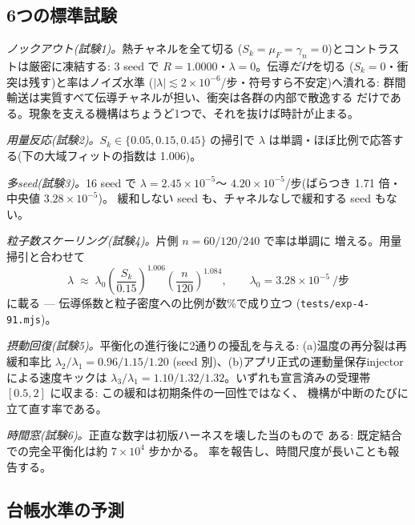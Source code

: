 \documentclass[a4paper,10pt,twocolumn]{ltjsarticle}
\begin{document}
\subsection{6つの標準試験}

\emph{ノックアウト(試験1)。}熱チャネルを全て切る
($S_k=\mu_F=\gamma_n=0$)とコントラストは厳密に凍結する:
3 seed で $R=1.0000$・$\lambda=0$。伝導\emph{だけ}を切る
($S_k=0$・衝突は残す)と率はノイズ水準
($|\lambda|\lesssim 2\times10^{-6}$/步・符号すら不安定)へ潰れる:
群間輸送は実質すべて伝導チャネルが担い、衝突は各群の内部で散逸する
だけである。現象を支える機構はちょうど1つで、それを抜けば時計が止まる。

\emph{用量反応(試験2)。}$S_k \in \{0.05, 0.15, 0.45\}$ の掃引で
$\lambda$ は単調・ほぼ比例で応答する(下の大域フィットの指数は 1.006)。

\emph{多seed(試験3)。}16 seed で $\lambda = 2.45\times10^{-5}$〜
$4.20\times10^{-5}$/步(ばらつき 1.71 倍・中央値 $3.28\times10^{-5}$)。
緩和しない seed も、チャネルなしで緩和する seed もない。

\emph{粒子数スケーリング(試験4)。}片側 $n=60/120/240$ で率は単調に
増える。用量掃引と合わせて
\begin{equation}
\lambda \;\approx\; \lambda_0
\left(\frac{S_k}{0.15}\right)^{1.006}
\left(\frac{n}{120}\right)^{1.084},
\qquad \lambda_0 = 3.28\times10^{-5}\ \text{/步}
\label{eq:microfit-ja}
\end{equation}
に載る — 伝導係数と粒子密度への比例が数\%で成り立つ
(\texttt{tests/exp-4-91.mjs})。

\emph{摂動回復(試験5)。}平衡化の進行後に2通りの擾乱を与える:
(a)温度の再分裂は再緩和率比 $\lambda_2/\lambda_1 = 0.96/1.15/1.20$
(seed 別)、(b)アプリ正式の運動量保存injectorによる速度キックは
$\lambda_3/\lambda_1 = 1.10/1.32/1.32$。いずれも宣言済みの受理帯
$[0.5, 2]$ に収まる: この緩和は初期条件の一回性ではなく、
機構が中断のたびに立て直す率である。

\emph{時間窓(試験6)。}正直な数字は初版ハーネスを壊した当のもので
ある: 既定結合での完全平衡化は約 $7\times10^{4}$ 步かかる。
率を報告し、時間尺度が長いことも報告する。

\subsection{台帳水準の予測}
\end{document}
